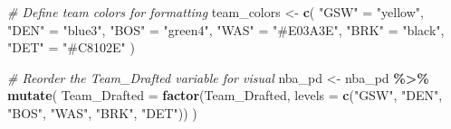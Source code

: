 \documentclass[
]{article}
\newenvironment{Shaded}{\begin{snugshade}}{\end{snugshade}}
\newcommand{\AttributeTok}[1]{\textcolor[rgb]{0.13,0.29,0.53}{#1}}
\newcommand{\CommentTok}[1]{\textcolor[rgb]{0.56,0.35,0.01}{\textit{#1}}}
\newcommand{\FunctionTok}[1]{\textcolor[rgb]{0.13,0.29,0.53}{\textbf{#1}}}
\newcommand{\NormalTok}[1]{#1}
\newcommand{\OtherTok}[1]{\textcolor[rgb]{0.56,0.35,0.01}{#1}}
\newcommand{\SpecialCharTok}[1]{\textcolor[rgb]{0.81,0.36,0.00}{\textbf{#1}}}
\newcommand{\StringTok}[1]{\textcolor[rgb]{0.31,0.60,0.02}{#1}}
\begin{document}
\begin{Shaded}
\begin{Highlighting}[]
\CommentTok{\# Define team colors for formatting}
\NormalTok{team\_colors }\OtherTok{\textless{}{-}} \FunctionTok{c}\NormalTok{(}
  \StringTok{"GSW"} \OtherTok{=} \StringTok{"yellow"}\NormalTok{, }
  \StringTok{"DEN"} \OtherTok{=} \StringTok{"blue3"}\NormalTok{,}
  \StringTok{"BOS"} \OtherTok{=} \StringTok{"green4"}\NormalTok{, }
  \StringTok{"WAS"} \OtherTok{=} \StringTok{"\#E03A3E"}\NormalTok{,}
  \StringTok{"BRK"} \OtherTok{=} \StringTok{"black"}\NormalTok{,  }
  \StringTok{"DET"} \OtherTok{=} \StringTok{"\#C8102E"} 
\NormalTok{)}

\CommentTok{\# Reorder the Team\_Drafted variable for visual}
\NormalTok{nba\_pd }\OtherTok{\textless{}{-}}\NormalTok{ nba\_pd }\SpecialCharTok{\%\textgreater{}\%}
  \FunctionTok{mutate}\NormalTok{(}
    \AttributeTok{Team\_Drafted =} \FunctionTok{factor}\NormalTok{(Team\_Drafted, }\AttributeTok{levels =} \FunctionTok{c}\NormalTok{(}\StringTok{"GSW"}\NormalTok{, }\StringTok{"DEN"}\NormalTok{, }\StringTok{"BOS"}\NormalTok{, }\StringTok{"WAS"}\NormalTok{, }\StringTok{"BRK"}\NormalTok{, }\StringTok{"DET"}\NormalTok{))}
\NormalTok{  )}


\end{Highlighting}
\end{Shaded}
\end{document}
